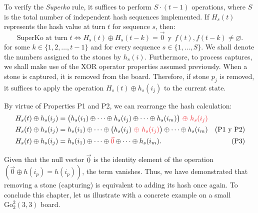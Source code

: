 To verify the \textit{Superko} rule, it suffices to perform \(S \cdot (t-1)\) operations, where \(S\) is the total number of independent hash sequences implemented. If \(H_{s}(t)\) represents the hash value at turn \(t\) for sequence \(s\), then:
$$ \text{SuperKo at turn } t \iff H_{s}(t) \oplus H_{s}(t-k) = \vec{0}\ \ \text{y}\ \  f(t),f(t-k)\neq \varnothing.$$
for some $k \in \{1, 2, \dots, t-1\}$ and for every sequence $s \in \{1, \dots, S\}$. We shall denote the numbers assigned to the stones by $h_s(i)$. Furthermore, to process captures, we shall make use of the XOR operator properties assumed previously. When a stone is captured, it is removed from the board. Therefore, if stone $p_{j}$ is removed, it suffices to apply the operation $H_s(t) \oplus h_s(i_{j})$ to the current state.

By virtue of Properties P1 and P2, we can rearrange the hash calculation:
\begin{align*}
	H_s(t) \oplus h_s(i_{j}) &= \big( h_s(i_{1}) \oplus \dots \oplus h_s(i_{j}) \oplus \dots \oplus h_s(i_{m}) \big) \ \textcolor{Red}{\oplus \ h_s(i_{j})} \\
	H_s(t) \oplus h_s(i_{j}) &= h_s(i_{1}) \oplus \dots \oplus \big( h_s(i_{j}) \ \textcolor{Red}{\oplus \ h_s(i_{j})} \big) \oplus \dots \oplus h_s(i_{m}) & \text{(P1 y P2)} \\
	H_s(t) \oplus h_s(i_{j}) &= h_s(i_{1}) \oplus \dots \oplus \textcolor{Red}{\vec{0}} \oplus \dots \oplus h_s(i_{m}). & \text{(P3)}
\end{align*}

Given that the null vector \(\vec{0}\) is the identity element of the operation \((\vec{0}\oplus h(i_{p})=h(i_{p}))\), the term vanishes. Thus, we have demonstrated that removing a stone (capturing) is equivalent to adding its hash once again. To conclude this chapter, let us illustrate with a concrete example on a small \(\mathrm{Go}^{2}_{2}(3,3)\) board.

